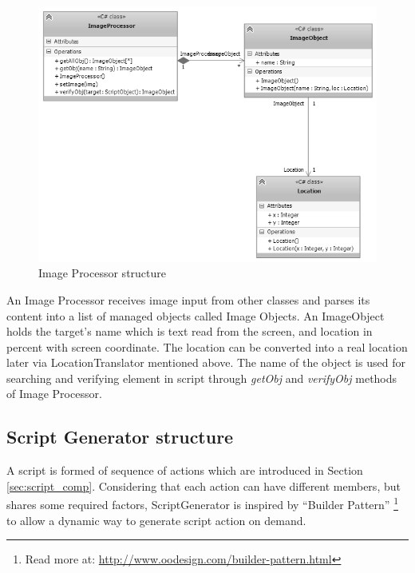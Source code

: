 	\begin{figure}[H]
		\centering
		\includegraphics[scale=0.75]{Chapters/Fig/img_processor.png}
		\caption{Image Processor structure}
		\label{fig:img_processor}
	\end{figure}

An Image Processor receives image input from other classes and parses its content into a list of managed objects called Image Objects. An ImageObject holds the target's name which is text read from the screen, and location in percent with screen coordinate. The location can be converted into a real location later via LocationTranslator mentioned above. The name of the object is used for searching and verifying element in script through \textit{getObj} and \textit{verifyObj} methods of Image Processor.

\subsection{Script Generator structure}
A script is formed of sequence of actions which are introduced in Section \ref{sec:script_comp}. Considering that each action can have different members, but shares some required factors, ScriptGenerator is inspired by ``Builder Pattern'' \footnote{Read more at: \url{http://www.oodesign.com/builder-pattern.html}} to allow a dynamic way to generate script action on demand.

